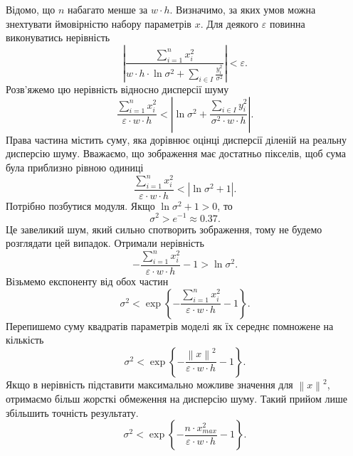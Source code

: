 Відомо, що $n$ набагато менше за $w \cdot h$.
Визначимо, за яких умов можна знехтувати ймовірністю набору параметрів $x$.
Для деякого $\varepsilon$ повинна виконуватись нерівність
\begin{equation*}
  \left|
    \frac{\sum\limits_{i = 1}^n x_i^2}
         {w \cdot h \cdot \ln{\sigma^2}
          + \sum\limits_{i \in I}
            \frac{ y_i^2}{\sigma^2}}
  \right|
  < \varepsilon.
\end{equation*}
Розв'яжемо цю нерівність відносно дисперсії шуму
\begin{equation*}
  \frac{\sum\limits_{i = 1}^n x_i^2}{\varepsilon \cdot w \cdot h}
  < \left| \ln\sigma^2
    + \frac{\sum\limits_{i \in I} y_i^2}
           {\sigma^2 \cdot w \cdot h}
   \right|.
\end{equation*}
Права частина містить суму, яка дорівнює оцінці дисперсії
діленій на реальну дисперсію шуму.
Вважаємо, що зображення має достатньо пікселів,
щоб сума була приблизно рівною одиниці
\begin{equation*}
  \frac{\sum\limits_{i = 1}^n x_i^2}{\varepsilon \cdot w \cdot h}
  < \left| \ln\sigma^2 + 1 \right|.
\end{equation*}
Потрібно позбутися модуля.
Якщо $\ln\sigma^2 + 1 > 0$, то
\begin{equation*}
  \sigma^2 > e^{-1} \approx 0.37.
\end{equation*}
Це завеликий шум, який сильно спотворить зображення,
тому не будемо розглядати цей випадок.
Отримали нерівність
\begin{equation*}
  - \frac{\sum\limits_{i = 1}^n x_i^2}{\varepsilon \cdot w \cdot h} - 1
  > \ln\sigma^2.
\end{equation*}
Візьмемо експоненту від обох частин
\begin{equation*}
  \sigma^2
  < \exp{\left\{
      - \frac{\sum\limits_{i = 1}^n x_i^2}
             {\varepsilon \cdot w \cdot h}
      - 1
    \right\}}.
\end{equation*}
Перепишемо суму квадратів параметрів моделі як їх середнє помножене на кількість
\begin{equation*}
  \sigma^2
  < \exp{\left\{
      - \frac{\left\| x \right\|^2}
             {\varepsilon \cdot w \cdot h}
      - 1
    \right\}}.
\end{equation*}
Якщо в нерівність підставити максимально можливе значення для
$\left\| x \right\|^2$,
отримаємо більш жорсткі обмеження на дисперсію шуму.
Такий прийом лише збільшить точність результату.
\begin{equation*}
  \sigma^2
  < \exp{\left\{
      - \frac{n \cdot x_{max}^2}
             {\varepsilon \cdot w \cdot h}
      - 1
    \right\}}.
\end{equation*}

